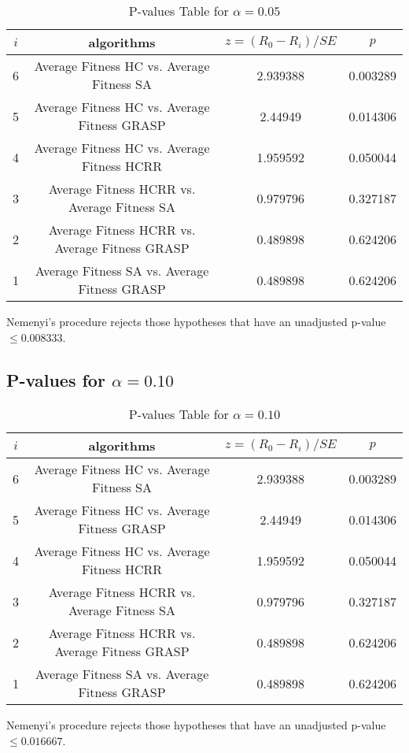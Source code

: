 \documentclass[a4paper,10pt]{article}
\begin{document}
\begin{landscape}
\begin{table}[!htp]
\centering\scriptsize
\begin{tabular}{cccc}
$i$&algorithms&$z=(R_0 - R_i)/SE$&$p$\\
\hline6&Average Fitness HC vs. Average Fitness SA&2.939388&0.003289\\
5&Average Fitness HC vs. Average Fitness GRASP&2.44949&0.014306\\
4&Average Fitness HC vs. Average Fitness HCRR&1.959592&0.050044\\
3&Average Fitness HCRR vs. Average Fitness SA&0.979796&0.327187\\
2&Average Fitness HCRR vs. Average Fitness GRASP&0.489898&0.624206\\
1&Average Fitness SA vs. Average Fitness GRASP&0.489898&0.624206\\
\hline
\end{tabular}
\caption{P-values Table for $\alpha=0.05$}
\end{table}Nemenyi's procedure rejects those hypotheses that have an unadjusted p-value $\le0.008333$.

\pagebreak

\subsection{P-values for $\alpha=0.10$}

\begin{table}[!htp]
\centering\scriptsize
\begin{tabular}{cccc}
$i$&algorithms&$z=(R_0 - R_i)/SE$&$p$\\
\hline6&Average Fitness HC vs. Average Fitness SA&2.939388&0.003289\\
5&Average Fitness HC vs. Average Fitness GRASP&2.44949&0.014306\\
4&Average Fitness HC vs. Average Fitness HCRR&1.959592&0.050044\\
3&Average Fitness HCRR vs. Average Fitness SA&0.979796&0.327187\\
2&Average Fitness HCRR vs. Average Fitness GRASP&0.489898&0.624206\\
1&Average Fitness SA vs. Average Fitness GRASP&0.489898&0.624206\\
\hline
\end{tabular}
\caption{P-values Table for $\alpha=0.10$}
\end{table}Nemenyi's procedure rejects those hypotheses that have an unadjusted p-value $\le0.016667$.


\end{landscape}
\end{document}
